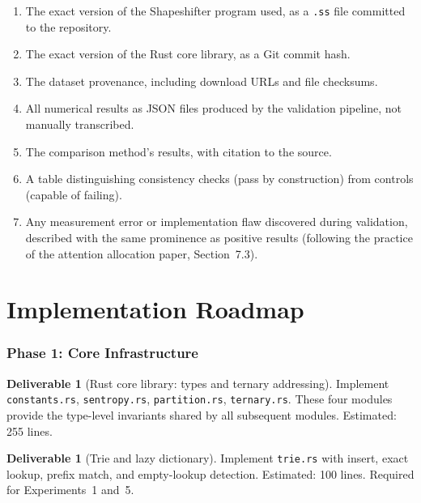 \documentclass[11pt,a4paper]{article}
\theoremstyle{planstyle}
\theoremstyle{definition}
\newtheorem{deliverable}[theorem]{Deliverable}
\theoremstyle{remark}
\newcommand{\shk}[1]{\texttt{#1}}
\begin{document}
\begin{enumerate}[nosep,label=(\roman*)]
\item The exact version of the Shapeshifter program used, as a
  \shk{.ss} file committed to the repository.
\item The exact version of the Rust core library, as a Git commit hash.
\item The dataset provenance, including download URLs and file checksums.
\item All numerical results as JSON files produced by the validation
  pipeline, not manually transcribed.
\item The comparison method's results, with citation to the source.
\item A table distinguishing consistency checks (pass by construction)
  from controls (capable of failing).
\item Any measurement error or implementation flaw discovered during
  validation, described with the same prominence as positive results
  (following the practice of the attention allocation paper,
  Section~7.3).
\end{enumerate}

\part{Implementation Roadmap}

\section{Phase 1: Core Infrastructure}
\label{sec:phase1}

\begin{deliverable}[Rust core library: types and ternary addressing]
\label{del:core}
Implement \shk{constants.rs}, \shk{sentropy.rs}, \shk{partition.rs},
\shk{ternary.rs}. These four modules provide the type-level invariants
shared by all subsequent modules. Estimated: 255 lines.
\end{deliverable}

\begin{deliverable}[Trie and lazy dictionary]
\label{del:trie}
Implement \shk{trie.rs} with insert, exact lookup, prefix match, and
empty-lookup detection. Estimated: 100 lines. Required for
Experiments~1 and~5.
\end{deliverable}
\end{document}

